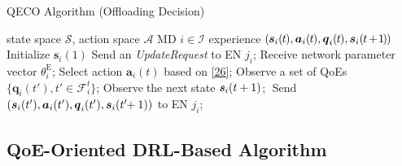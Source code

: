 \documentclass[10pt, journal,letterpaper]{IEEEtran}
\begin{document}
\begin{algorithm} [tbp]
	\caption{QECO Algorithm (Offloading Decision)}\label{alg:cap}
	\begin{algorithmic}[1]
		\renewcommand{\algorithmicrequire}{\textbf{Input:}} 
		\renewcommand{\algorithmicensure}{\textbf{Output:}}
		\Require state space $\mathcal{S}$, action space $\mathcal{A}$
		\Ensure MD $i \in \mathcal{I}$ experience  \textcolor{blue}{ $(\hspace{-0.2mm}\boldsymbol{s}_i(\hspace{-0.2mm}t\hspace{-0.2mm}), \boldsymbol{a}_i(\hspace{-0.2mm}t\hspace{-0.2mm}), \boldsymbol{q}_i(\hspace{-0.2mm}t\hspace{-0.2mm}), \boldsymbol{s}_i(\hspace{-0.2mm}t\hspace{-0.3mm}+\hspace{-0.3mm}\hspace{-0.2mm}1\hspace{-0.2mm}\hspace{-0.2mm})\hspace{-0.2mm})$}
		\State Initialize $\boldsymbol{s}_i(1)$
		\State Send an \textit{UpdateRequest} to EN $j_i$;
		\State Receive network parameter vector $\theta_i^{\text{E}}$;
		\State Select action $\boldsymbol{a}_i(t)$ based on \eqref{26};
		\EndIf
		\State Observe a set of QoEs $\{\boldsymbol{q}_i(t'), t' \in \mathcal{F}_i^t\}$;
		\State Observe\textcolor{white}{i}the next\textcolor{white}{i}state $\textbf{\textit{s}}_i(t+1)$;\textcolor{white}{i}
		\State Send \hspace{-1mm} $(\boldsymbol{s}_i(t'), \boldsymbol{a}_i(t'), \boldsymbol{q}_i(t'), \boldsymbol{s}_i(t'\hspace{-1mm}+1))$ to EN $j_i$;
		\EndFor
		\EndFor
		\EndFor
	\end{algorithmic}
\end{algorithm}


\subsection{QoE-Oriented DRL-Based Algorithm}
\label{section:1}

\end{document}
